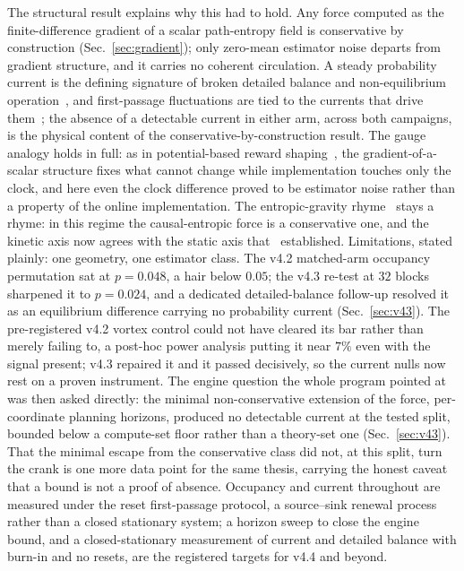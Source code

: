 \documentclass[11pt]{article}
\begin{document}
The structural result explains why this had to hold. Any force computed as the finite-difference gradient of a scalar path-entropy field is conservative by construction (Sec.~\ref{sec:gradient}); only zero-mean estimator noise departs from gradient structure, and it carries no coherent circulation. A steady probability current is the defining signature of broken detailed balance and non-equilibrium operation~\cite{seifert,battle}, and first-passage fluctuations are tied to the currents that drive them~\cite{gingrich}; the absence of a detectable current in either arm, across both campaigns, is the physical content of the conservative-by-construction result. The gauge analogy holds in full: as in potential-based reward shaping~\cite{ngharada,jenner}, the gradient-of-a-scalar structure fixes what cannot change while implementation touches only the clock, and here even the clock difference proved to be estimator noise rather than a property of the online implementation. The entropic-gravity rhyme~\cite{verlinde2017,visser} stays a rhyme: in this regime the causal-entropic force is a conservative one, and the kinetic axis now agrees with the static axis that~\cite{v3} established. Limitations, stated plainly: one geometry, one estimator class. The v4.2 matched-arm occupancy permutation sat at $p = 0.048$, a hair below $0.05$; the v4.3 re-test at $32$ blocks sharpened it to $p = 0.024$, and a dedicated detailed-balance follow-up resolved it as an equilibrium difference carrying no probability current (Sec.~\ref{sec:v43}). The pre-registered v4.2 vortex control could not have cleared its bar rather than merely failing to, a post-hoc power analysis putting it near $7\%$ even with the signal present; v4.3 repaired it and it passed decisively, so the current nulls now rest on a proven instrument. The engine question the whole program pointed at was then asked directly: the minimal non-conservative extension of the force, per-coordinate planning horizons, produced no detectable current at the tested split, bounded below a compute-set floor rather than a theory-set one (Sec.~\ref{sec:v43}). That the minimal escape from the conservative class did not, at this split, turn the crank is one more data point for the same thesis, carrying the honest caveat that a bound is not a proof of absence. Occupancy and current throughout are measured under the reset first-passage protocol, a source--sink renewal process rather than a closed stationary system; a horizon sweep to close the engine bound, and a closed-stationary measurement of current and detailed balance with burn-in and no resets, are the registered targets for v4.4 and beyond.
\end{document}
